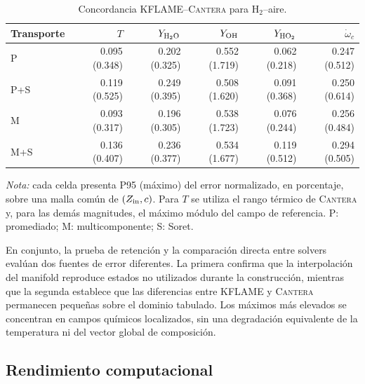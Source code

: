 \documentclass[12pt,a4paper,twoside,openany]{book}
\newcommand{\KFLAME}{\textsc{KFLAME}\xspace}
\newcommand{\Cantera}{\textsc{Cantera}\xspace}
\begin{document}
\begin{table}[H]
\centering
\scriptsize
\caption{Concordancia \KFLAME{}--\Cantera{} para H$_2$--aire.}
\label{tab:fgm-h2-concordance}
\begin{tabular}{lrrrrr}
\toprule
Transporte &
\(T\) &
\(Y_{\rm H_2O}\) &
\(Y_{\rm OH}\) &
\(Y_{\rm HO_2}\) &
\(\dot{\omega}_c\) \\
\midrule
P
& 0.095 (0.348)
& 0.202 (0.325)
& 0.552 (1.719)
& 0.062 (0.218)
& 0.247 (0.512) \\
P+S
& 0.119 (0.525)
& 0.249 (0.395)
& 0.508 (1.620)
& 0.091 (0.368)
& 0.250 (0.614) \\
M
& 0.093 (0.317)
& 0.196 (0.305)
& 0.538 (1.723)
& 0.076 (0.244)
& 0.256 (0.484) \\
M+S
& 0.136 (0.407)
& 0.236 (0.377)
& 0.534 (1.677)
& 0.119 (0.512)
& 0.294 (0.505) \\
\bottomrule
\end{tabular}

\vspace{0.4em}
\begin{minipage}{0.96\textwidth}
\footnotesize
\textit{Nota:} cada celda presenta P95 (máximo) del error normalizado, en
porcentaje, sobre una malla común de \((Z_{\rm in},c)\). Para \(T\) se utiliza
el rango térmico de \Cantera{} y, para las demás magnitudes, el máximo módulo
del campo de referencia. P: promediado; M: multicomponente; S: Soret.
\end{minipage}
\end{table}

En conjunto, la prueba de retención y la comparación directa entre solvers
evalúan dos fuentes de error diferentes. La primera confirma que la
interpolación del manifold reproduce estados no utilizados durante la
construcción, mientras que la segunda establece que las diferencias entre
\KFLAME{} y \Cantera{} permanecen pequeñas sobre el dominio tabulado. Los
máximos más elevados se concentran en campos químicos localizados, sin una
degradación equivalente de la temperatura ni del vector global de composición.

\FloatBarrier


\subsection{Rendimiento computacional}
\label{sec:fgm-performance}
\end{document}
